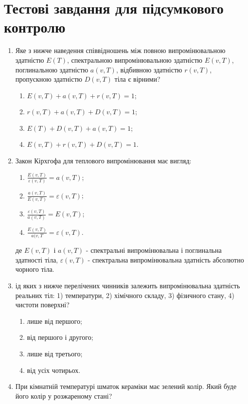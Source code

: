 \documentclass[twocolumn]{el-author}
\begin{document}
\section{Тестові завдання для підсумкового контролю}

\begin{enumerate}
	\item Яке з нижче наведення співвідношень між повною випромінювальною
здатністю $E(T)$, спектральною випромінювальною здатністю $E(v, T)$,
поглинальною здатністю $a(v,T)$, відбивною здатністю $r(v, T)$, пропускною
здатністю $D(v,T)$ тіла є вірними?
	\begin{enumerate}
		\item $E(v,T) + a(v,T) + r(v,T) = 1$;
		\item $r(v,T) + a(v,T) + D(v,T) = 1$;
		\item $E(T) + D(v,T) + a(v,T) = 1$;
		\item $E(v,T) + r(v,T) + D(v,T) = 1$.
	\end{enumerate}
	\item Закон Кірхгофа для теплового випромінювання має вигляд:
	\begin{enumerate}
		\item $\frac{E(v,T)}{\varepsilon (v,T)} = a(v,T)$;
		\item $\frac{a(v,T)}{E(v,T)} = \varepsilon (v,T)$;
		\item $\frac{\varepsilon (v,T)}{a(v,T)} = E(v,T)$;
		\item $\frac{E(v,T)}{a(v,T} = \varepsilon (v,T)$.
	\end{enumerate}
	де $E(v,T)$ і $a(v,T)$ - спектральні випромінювальна і поглинальна здатності тіла,
	$\varepsilon (v,T)$ - спектральна випромінювальна здатність абсолютно чорного тіла.
	\item ід яких з нижче перелічених чинників залежить випромінювальна
здатність реальних тіл: 1) температури, 2) хімічного складу, 3) фізичного
стану, 4) чистоти поверхні?
	\begin{enumerate}
		\item лише від першого;
		\item від першого і другого;
		\item лише від третього;
		\item від усіх чотирьох.
	\end{enumerate}
	\item При кімнатній температурі шматок кераміки має зелений колір. Який буде
його колір у розжареному стані?
	\begin{enumerate}

\end{enumerate}
\end{enumerate}
\end{document}
